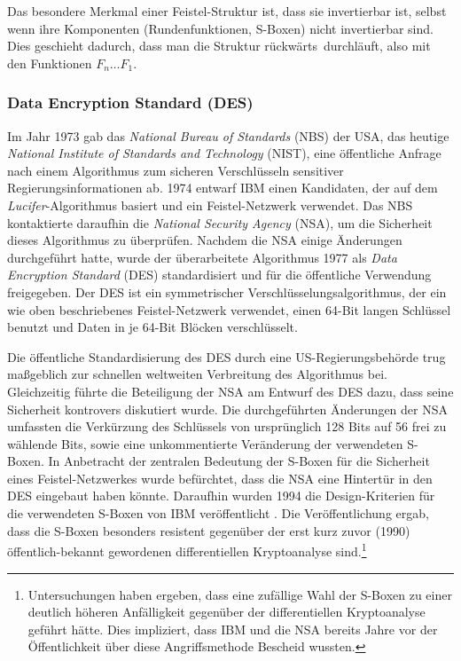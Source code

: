 Das besondere Merkmal einer Feistel-Struktur ist, dass sie invertierbar
ist, selbst wenn ihre Komponenten (Rundenfunktionen, S-Boxen) nicht
invertierbar sind. Dies geschieht dadurch, dass man die Struktur \glqq
rückwärts\grqq~durchläuft, also mit den Funktionen $F_n \dots F_1$.

\subsubsection{Data Encryption Standard (DES)}
\label{sssec:des}
Im Jahr 1973 gab das \emph{National Bureau of Standards} (NBS) der USA, das heutige \emph{National Institute of Standards and Technology} (NIST), eine öffentliche Anfrage nach einem Algorithmus zum sicheren Verschlüsseln sensitiver Regierungsinformationen ab. 1974 entwarf IBM einen Kandidaten, der auf dem \emph{Lucifer}-Algorithmus basiert und ein Feistel-Netzwerk verwendet. Das NBS kontaktierte daraufhin die \emph{National Security Agency} (NSA), um die Sicherheit dieses Algorithmus zu überprüfen. Nachdem die NSA einige Änderungen durchgeführt hatte, wurde der überarbeitete Algorithmus 1977 als \emph{Data Encryption Standard} (DES) \indexDES \cite{NIST_DES99} standardisiert und für die öffentliche Verwendung freigegeben. Der DES ist ein symmetrischer Verschlüsselungsalgorithmus, der ein wie oben beschriebenes Feistel-Netzwerk verwendet, einen 64-Bit langen Schlüssel benutzt und Daten in je 64-Bit Blöcken verschlüsselt. 

Die öffentliche Standardisierung des DES durch eine US-Regierungsbehörde trug maßgeblich zur schnellen weltweiten Verbreitung des Algorithmus bei. Gleichzeitig führte die Beteiligung der NSA am Entwurf des DES dazu, dass seine Sicherheit kontrovers diskutiert wurde. Die durchgeführten Änderungen der NSA umfassten die Verkürzung des Schlüssels von ursprünglich 128 Bits auf 56 frei zu wählende Bits, sowie eine unkommentierte Veränderung der verwendeten S-Boxen. In Anbetracht der zentralen Bedeutung der S-Boxen für die Sicherheit eines Feistel-Netzwerkes wurde befürchtet, dass die NSA eine Hintertür in den DES eingebaut haben könnte. Daraufhin wurden 1994 die Design-Kriterien für die verwendeten S-Boxen von IBM veröffentlicht \cite{Coppersmith1994}. Die Veröffentlichung ergab, dass die S-Boxen besonders resistent gegenüber der erst kurz zuvor (1990) öffentlich-bekannt gewordenen differentiellen Kryptoanalyse sind.\footnote{Untersuchungen haben ergeben, dass eine zufällige Wahl der S-Boxen zu einer deutlich höheren Anfälligkeit gegenüber der differentiellen Kryptoanalyse geführt hätte. Dies impliziert, dass IBM und die NSA bereits Jahre vor der Öffentlichkeit über diese Angriffsmethode Bescheid wussten.}

